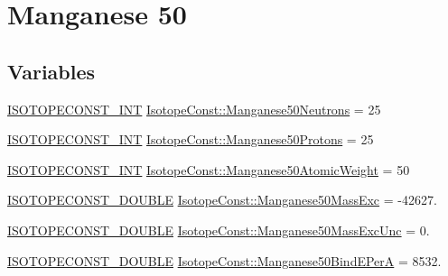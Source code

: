\hypertarget{group___isotope_const-_manganese-_mn50}{}\section{Manganese 50}
\label{group___isotope_const-_manganese-_mn50}
\subsection*{Variables}
\begin{DoxyCompactItemize}
\item 
\mbox{\hyperlink{group___isotope_const-_macros_ga5f18360b3e99483a35c32d789e62621c}{I\+S\+O\+T\+O\+P\+E\+C\+O\+N\+S\+T\+\_\+\+I\+NT}} \mbox{\hyperlink{group___isotope_const-_manganese-_mn50_ga362e8022b82bdbc47d024c33482d7353}{Isotope\+Const\+::\+Manganese50\+Neutrons}} = 25
\item 
\mbox{\hyperlink{group___isotope_const-_macros_ga5f18360b3e99483a35c32d789e62621c}{I\+S\+O\+T\+O\+P\+E\+C\+O\+N\+S\+T\+\_\+\+I\+NT}} \mbox{\hyperlink{group___isotope_const-_manganese-_mn50_ga33d5f8303762e76ea77eb3ab9c7f121a}{Isotope\+Const\+::\+Manganese50\+Protons}} = 25
\item 
\mbox{\hyperlink{group___isotope_const-_macros_ga5f18360b3e99483a35c32d789e62621c}{I\+S\+O\+T\+O\+P\+E\+C\+O\+N\+S\+T\+\_\+\+I\+NT}} \mbox{\hyperlink{group___isotope_const-_manganese-_mn50_ga012324324014e3220c63f3ea198bd2db}{Isotope\+Const\+::\+Manganese50\+Atomic\+Weight}} = 50
\item 
\mbox{\hyperlink{group___isotope_const-_macros_ga8f45a7272ce02c0b4c65c44636ed719a}{I\+S\+O\+T\+O\+P\+E\+C\+O\+N\+S\+T\+\_\+\+D\+O\+U\+B\+LE}} \mbox{\hyperlink{group___isotope_const-_manganese-_mn50_gaae8d5defc72a413f14c571dd4bd60a09}{Isotope\+Const\+::\+Manganese50\+Mass\+Exc}} = -\/42627.
\item 
\mbox{\hyperlink{group___isotope_const-_macros_ga8f45a7272ce02c0b4c65c44636ed719a}{I\+S\+O\+T\+O\+P\+E\+C\+O\+N\+S\+T\+\_\+\+D\+O\+U\+B\+LE}} \mbox{\hyperlink{group___isotope_const-_manganese-_mn50_gad6ede56329f652c01956f75126436e56}{Isotope\+Const\+::\+Manganese50\+Mass\+Exc\+Unc}} = 0.
\item 
\mbox{\hyperlink{group___isotope_const-_macros_ga8f45a7272ce02c0b4c65c44636ed719a}{I\+S\+O\+T\+O\+P\+E\+C\+O\+N\+S\+T\+\_\+\+D\+O\+U\+B\+LE}} \mbox{\hyperlink{group___isotope_const-_manganese-_mn50_ga040bc6379e2e71a7504bfdb4dc5c8cd9}{Isotope\+Const\+::\+Manganese50\+Bind\+E\+PerA}} = 8532.
\item 

\end{DoxyCompactItemize}
